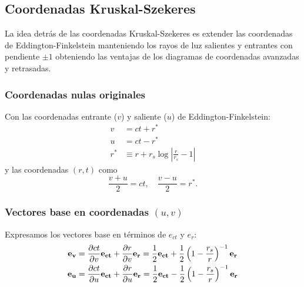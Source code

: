 \subsection{Coordenadas Kruskal-Szekeres}
La idea detrás de las coordenadas Kruskal-Szekeres es extender las coordenadas de Eddington-Finkelstein manteniendo los rayos de luz salientes y entrantes con pendiente $\pm 1$ obteniendo las ventajas de los diagramas de coordenadas avanzadas y retrasadas.
\subsubsection{Coordenadas nulas originales}
Con las coordenadas entrante (\(v\)) y saliente (\(u\)) de Eddington-Finkelstein:
\begin{equation}
    \begin{aligned}
        v   & = ct + r^*                                      \\
        u   & = ct - r^*                                      \\
        r^* & \equiv r + r_s \log\left|\frac{r}{r_s}-1\right|
    \end{aligned}
\end{equation}
y las coordenadas \( (r, t) \) como 
\begin{equation}
\frac{v+ u}{2} = ct, \quad \frac{v- u}{2} = r^*.
\end{equation}


\subsubsection{Vectores base en coordenadas \( (u, v) \)}
Expresamos los vectores base en términos de \( e_{ct} \) y \( e_r \):
\begin{equation}
    \begin{aligned}
        \mathbf{e_v} & = \frac{\partial ct}{\partial v}\mathbf{e_{ct}} + \frac{\partial r}{\partial v}\mathbf{e_r} = \frac{1}{2}\mathbf{e_{ct}} + \frac{1}{2}\left(1-\frac{r_s}{r}\right)^{-1}\mathbf{e_r} \\
        \mathbf{e_u} & = \frac{\partial ct}{\partial u}\mathbf{e_{ct}} + \frac{\partial r}{\partial u}\mathbf{e_r} = \frac{1}{2}\mathbf{e_{ct}} - \frac{1}{2}\left(1-\frac{r_s}{r}\right)^{-1}\mathbf{e_r}
    \end{aligned}
\end{equation}

